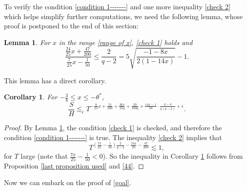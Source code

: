 \documentclass[11pt]{amsart}
\numberwithin{equation}{section}
\newtheorem{corollary}{Corollary}[theorem]
\newtheorem{lemma}[theorem]{Lemma}
\theoremstyle{definition}
\theoremstyle{proposition}
\begin{document}
To verify the condition \eqref{condition 1-------} and one more inequality \eqref{check 2} which helps simplify further computations, we need the following lemma, whose proof is postponed to the end of this section:
\begin{lemma}  \label{checking}
For $x$ in the range \eqref{range of x}, \eqref{check 1} holds  and 
\begin{equation}   \label{check 2}
\frac{\frac{24}{25}x+\frac{47}{200}}{\frac{7}{25}x-\frac{1}{50}}\le \frac{2}{q-2}= 5\sqrt{\frac{-1-8x}{2(1-14x)}}-1 .
\end{equation} 
\end{lemma}
This lemma has a direct corollary. 
\begin{corollary}   \label{final corollary}
For $-\frac{3}{8}\le x\le -\theta^*$,   
\[
\frac{S}{H} \lesssim_\epsilon  T^{-\frac{8}{25}x+\frac{51}{200}+\frac{36x}{25q}+\frac{29}{100q}+\frac{14x-1}{50}\cdot\frac{q-4}{q(q-2)}+\epsilon} . 
\]
\end{corollary}
\begin{proof}
By Lemma \ref{checking}, the condition \eqref{check 1} is checked, and therefore the condition \eqref{condition 1-------} is true. The inequality \eqref{check 2} implies that
\[
T^{(\frac{7x}{25}-\frac{1}{50})\frac{2}{q-2}-\frac{24x}{25}-\frac{47}{200}} \lesssim 1,
\]
for $T$ large (note that $\frac{7x}{25}-\frac{1}{50}<0$). So the inequality in Corollary \ref{final corollary} follows from Proposition \ref{last proposition used} and \eqref{44}. 
\end{proof}
Now we can embark on the proof of \eqref{goal}.
\end{document}
